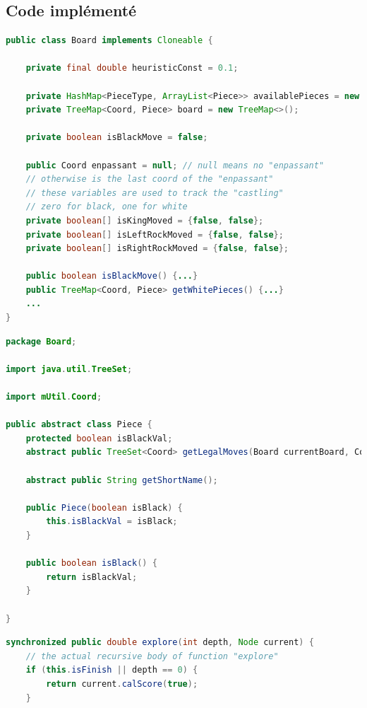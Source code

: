 \documentclass{article}
\begin{document}
\clearpage
\begin{appendices}
\section{Code implémenté}

\begin{lstlisting}[language=java, caption={Une partie des fonctions réalisées dans la classe \texttt{Board}.}, label={lst:board}]
public class Board implements Cloneable {

    private final double heuristicConst = 0.1;

    private HashMap<PieceType, ArrayList<Piece>> availablePieces = new HashMap<>();
    private TreeMap<Coord, Piece> board = new TreeMap<>();

    private boolean isBlackMove = false;
    
    public Coord enpassant = null; // null means no "enpassant"
    // otherwise is the last coord of the "enpassant"
    // these variables are used to track the "castling"
    // zero for black, one for white
    private boolean[] isKingMoved = {false, false};
    private boolean[] isLeftRockMoved = {false, false};
    private boolean[] isRightRockMoved = {false, false};

    public boolean isBlackMove() {...}
    public TreeMap<Coord, Piece> getWhitePieces() {...}
    ...
}
\end{lstlisting}

\begin{lstlisting}[language=java, caption={La classe abstracte \texttt{Piece}.}, label={lst:piece}]
package Board;

import java.util.TreeSet;

import mUtil.Coord;

public abstract class Piece {
    protected boolean isBlackVal;
    abstract public TreeSet<Coord> getLegalMoves(Board currentBoard, Coord currentCoord);

    abstract public String getShortName();
        
    public Piece(boolean isBlack) {
        this.isBlackVal = isBlack;
    }
    
    public boolean isBlack() {
        return isBlackVal;
    }

}
\end{lstlisting}

\begin{minipage}{\linewidth}
\begin{lstlisting}[language=java, caption={La variable \texttt{isFinish} et son utilisation sur la synchronisation.}, label={lst:isFinish}]
synchronized public double explore(int depth, Node current) {
    // the actual recursive body of function "explore"
    if (this.isFinish || depth == 0) {
        return current.calScore(true);
    }
    

\end{lstlisting}
\end{minipage}
\end{appendices}
\end{document}
